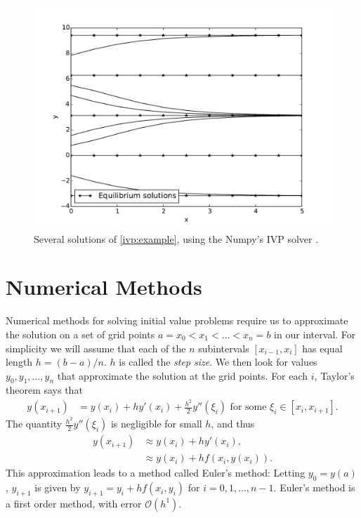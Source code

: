 \begin{figure}
\centering
\includegraphics[width=\textwidth]{example.pdf}
\caption{Several solutions of \eqref{ivp:example}, using the Numpy's IVP solver . }
\label{ivp:int_curves}
\end{figure}


\section*{Numerical Methods}
Numerical methods for solving initial value problems require us to approximate the solution on a set of grid points $a = x_0< x_1<\hdots< x_n = b$ in our interval.  
For simplicity we will assume that each of the $n$ subintervals $[x_{i-1},x_i]$ has equal length $h = (b-a)/n$. $h$ is called the \textit{step size}. 
We then look for values $y_0, y_1, \hdots, y_n$ that approximate the solution at the grid points.
For each $i$, Taylor's theorem says that
\begin{align*}
y(x_{i+1}) &= y(x_{i}) + h y'(x_i) + \frac{h^2}{2} y''(\xi_i)\text{ for some }\xi_i \in [x_i,x_{i+1}].
\end{align*}
The quantity $\frac{h^2}{2} y''(\xi_i)$ is negligible for small $h$, and thus
\begin{align*}
y(x_{i+1}) &\approx y(x_{i}) + h y'(x_i)  ,\\
&\approx y(x_{i}) + h f(x_i,y(x_i)).
\end{align*}
This approximation leads to a method called Euler's method: Letting $y_0 = y(a)$, $y_{i+1}$ is given by $y_{i+1} = y_i +hf(x_i,y_i)$ for $i = 0, 1, \hdots, n-1$.
Euler's method is a first order method, with error $\mathcal{O}(h^1)$.

